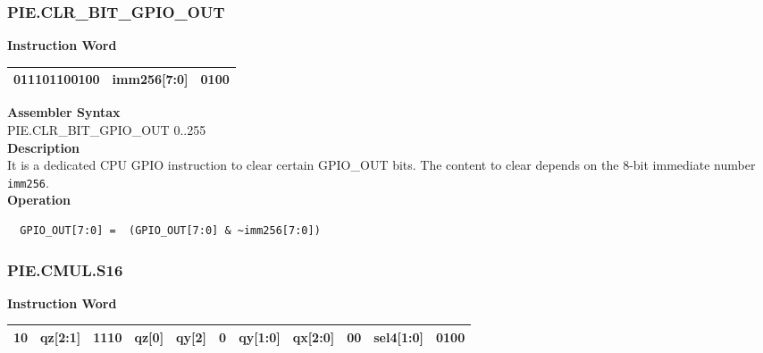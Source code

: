 \newpage
\subsubsection{PIE.CLR\_BIT\_GPIO\_OUT}\label{instruction:PIECLRBITGPIOOUT}
\setlength\tabcolsep{6pt}
\textbf{Instruction Word} \\
\begin{tabular}{|c|c|c|}
	\hline
	011101100100 & imm256[7:0] & 0100 \\
	\hline
\end{tabular}

\textbf{Assembler Syntax} \\
PIE.CLR\_BIT\_GPIO\_OUT 0..255 \\
\textbf{Description} \\
It is a dedicated CPU GPIO instruction to clear certain GPIO\_OUT bits. The content to clear depends on the 8-bit immediate number \lstinline{imm256}.\\
\textbf{Operation}
\begin{lstlisting}
  GPIO_OUT[7:0] =  (GPIO_OUT[7:0] & ~imm256[7:0])
\end{lstlisting}

\newpage
\subsubsection{PIE.CMUL.S16}\label{instruction:PIECMULS16}
\setlength\tabcolsep{6pt}
\textbf{Instruction Word} \\
\begin{tabular}{|c|c|c|c|c|c|c|c|c|c|c|}
	\hline
	10 & qz[2:1] & 1110 & qz[0] & qy[2] & 0 & qy[1:0] & qx[2:0] & 00 & sel4[1:0] & 0100 \\
	\hline
\end{tabular}

